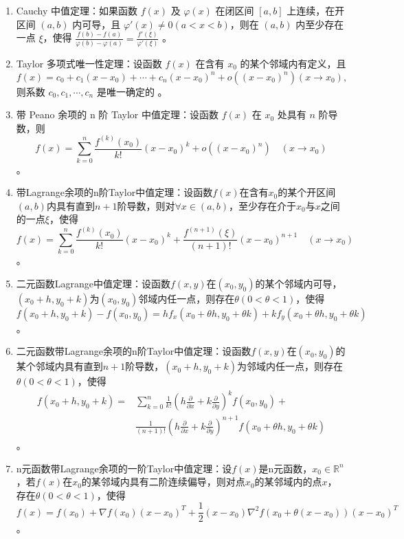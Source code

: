 \documentclass[UTF8]{ctexart}
\theoremstyle{remark}
\begin{document}
\begin{enumerate}
	\item Cauchy 中值定理：如果函数 \(f(x)\) 及 \(\varphi(x)\) 在闭区间 \([a, b]\) 上连续，在开区间 \((a, b)\) 内可导，且 \(\varphi'(x) \neq 0(a<x<b)\)，则在 \((a, b)\) 内至少存在一点 \(\xi\)，使得 \(\frac{f(b)-f(a)}{\varphi(b)-\varphi(a)}=\frac{f'(\xi)}{\varphi'(\xi)}\) 。
	
	\item Taylor 多项式唯一性定理：设函数 \(f(x)\) 在含有 \(x_{0}\) 的某个邻域内有定义，且
	\[
	f(x)=c_{0}+c_{1}\left(x-x_{0}\right)+\cdots+c_{n}\left(x-x_{0}\right)^{n}+o\left(\left(x-x_{0}\right)^{n}\right)\left(x \to x_{0}\right),
	\]
	则系数 \(c_{0}, c_{1}, \cdots, c_{n}\) 是唯一确定的 。
	
	\item 带 Peano 余项的 n 阶 Taylor 中值定理：设函数 \(f(x)\) 在 \(x_{0}\) 处具有 \(n\) 阶导数，则
	\[
	f(x)=\sum_{k=0}^{n} \frac{f^{(k)}\left(x_{0}\right)}{k !}\left(x-x_{0}\right)^{k}+o\left(\left(x-x_{0}\right)^{n}\right) \quad\left(x \to x_{0}\right)
	\] 。
		
		\item 带Lagrange余项的n阶Taylor中值定理：设函数\(f(x)\)在含有\(x_0\)的某个开区间\((a, b)\)内具有直到\(n+1\)阶导数，则对\(\forall x \in (a, b)\)，至少存在介于\(x_0\)与\(x\)之间的一点\(\xi\)，使得
		\[
		f(x) = \sum_{k=0}^{n} \frac{f^{(k)}(x_0)}{k!}(x - x_0)^k + \frac{f^{(n+1)}(\xi)}{(n+1)!}(x - x_0)^{n+1} \quad (x \to x_0)
		\]。
		
		\item 二元函数Lagrange中值定理：设函数\(f(x, y)\)在\((x_0, y_0)\)的某个邻域内可导，\((x_0 + h, y_0 + k)\)为\((x_0, y_0)\)邻域内任一点，则存在\(\theta(0 < \theta < 1)\)，使得
		\[
		f(x_0 + h, y_0 + k) - f(x_0, y_0) = hf_x(x_0 + \theta h, y_0 + \theta k) + kf_y(x_0 + \theta h, y_0 + \theta k)
		\]。
		
		\item 二元函数带Lagrange余项的n阶Taylor中值定理：设函数\(f(x, y)\)在\((x_0, y_0)\)的某个邻域内具有直到\(n+1\)阶导数，\((x_0 + h, y_0 + k)\)为邻域内任一点，则存在\(\theta(0 < \theta < 1)\)，使得
		\[
		\begin{aligned}
			f(x_0 + h, y_0 + k) = & \sum_{k=0}^{n} \frac{1}{k!}\left(h\frac{\partial}{\partial x} + k\frac{\partial}{\partial y}\right)^k f(x_0, y_0) + \\
			& \frac{1}{(n+1)!}\left(h\frac{\partial}{\partial x} + k\frac{\partial}{\partial y}\right)^{n+1} f(x_0 + \theta h, y_0 + \theta k)
		\end{aligned}
		\]。
		
		\item n元函数带Lagrange余项的一阶Taylor中值定理：设\(f(x)\)是n元函数，\(x_0 \in \mathbb{R}^n\)，若\(f(x)\)在\(x_0\)的某邻域内具有二阶连续偏导，则对点\(x_0\)的某邻域内的点\(x\)，存在\(\theta(0 < \theta < 1)\)，使得
		\[
		f(x) = f(x_0) + \nabla f(x_0)(x - x_0)^T + \frac{1}{2}(x - x_0)\nabla^2 f(x_0 + \theta(x - x_0))(x - x_0)^T
		\]。
		

\end{enumerate}
\end{document}
